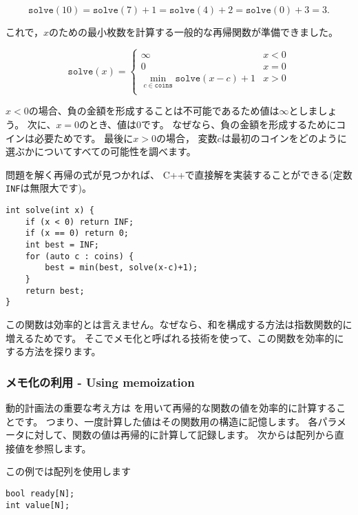 \[ \texttt{solve}(10) = \texttt{solve}(7)+1 = \texttt{solve}(4)+2 = \texttt{solve}(0)+3 = 3.\]

これで，$x$のための最小枚数を計算する一般的な再帰関数が準備できました。

\begin{equation*}
    \texttt{solve}(x) = \begin{cases}
               \infty               & x < 0\\
               0               & x = 0\\
               \min_{c \in \texttt{coins}} \texttt{solve}(x-c)+1 & x > 0 \\
           \end{cases}
\end{equation*}

$x<0$の場合、負の金額を形成することは不可能であるため値は$\infty$としましょう。
次に、$x = 0$のとき、値は$0$です。
なぜなら、負の金額を形成するためにコインは必要ためです。
最後に$x > 0$の場合，
変数$c$は最初のコインをどのように選ぶかについてすべての可能性を調べます。

問題を解く再帰の式が見つかれば、
C++で直接解を実装することができる(定数\texttt{INF}は無限大です)。

\begin{lstlisting}
int solve(int x) {
    if (x < 0) return INF;
    if (x == 0) return 0;
    int best = INF;
    for (auto c : coins) {
        best = min(best, solve(x-c)+1);
    }
    return best;
}
\end{lstlisting}

この関数は効率的とは言えません。なぜなら、和を構成する方法は指数関数的に増えるためです。
そこでメモ化と呼ばれる技術を使って、この関数を効率的にする方法を探ります。

\subsubsection{メモ化の利用 - Using memoization}


動的計画法の重要な考え方は
を用いて再帰的な関数の値を効率的に計算することです。
つまり、一度計算した値はその関数用の構造に記憶します。
各パラメータに対して、関数の値は再帰的に計算して記録します。
次からは配列から直接値を参照します。

この例では配列を使用します
\begin{lstlisting}
bool ready[N];
int value[N];
\end{lstlisting}

